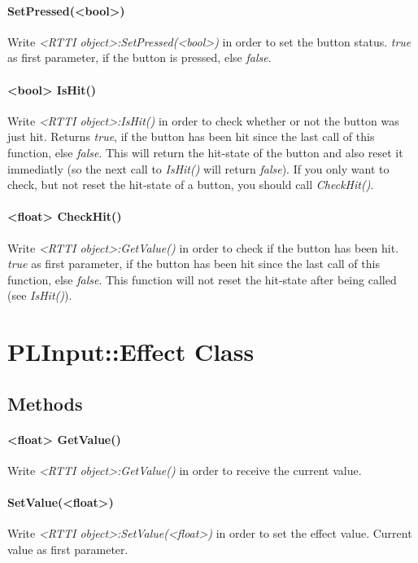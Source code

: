 \paragraph{SetPressed(<bool>)}
Write \emph{<RTTI object>:SetPressed(<bool>)} in order to set the button status. \emph{true} as first parameter, if the button is pressed, else \emph{false}.

\paragraph{<bool> IsHit()}
Write \emph{<RTTI object>:IsHit()} in order to check whether or not the button was just hit. Returns \emph{true}, if the button has been hit since the last call of this function, else \emph{false}. This will return the hit-state of the button and also reset it immediatly (so the next call to \emph{IsHit()} will return \emph{false}). If you only want to check, but not reset the hit-state of a button, you should call \emph{CheckHit()}.

\paragraph{<float> CheckHit()}
Write \emph{<RTTI object>:GetValue()} in order to check if the button has been hit. \emph{true} as first parameter, if the button has been hit since the last call of this function, else \emph{false}. This function will not reset the hit-state after being called (see \emph{IsHit()}).




\section{PLInput::Effect Class}


\subsection{Methods}

\paragraph{<float> GetValue()}
Write \emph{<RTTI object>:GetValue()} in order to receive the current value.

\paragraph{SetValue(<float>)}
Write \emph{<RTTI object>:SetValue(<float>)} in order to set the effect value. Current value as first parameter.




